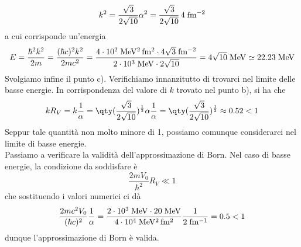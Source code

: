 \begin{soluzione}
\begin{equation*}
      k^2
      =\frac{\sqrt{3}}{2\sqrt{10}} \alpha^2
      =\rm \frac{\sqrt{3}}{2\sqrt{10}} \, 4 \; fm^{-2}
   \end{equation*}
   a cui corrisponde un'energia
   \begin{equation*}
      E
      =\frac{\hbar^2 k^2}{2 m}
      =\frac{(\hbar c)^2 k^2}{2 m c^2}
      =\rm \frac{4 \cdot 10^2 \; MeV^2 \, fm^2 \cdot 4\sqrt{3} \; fm^{-2}}{2 \cdot 10^3 \; MeV \cdot 2\sqrt{10}}
      =\rm 4\sqrt{10} \; MeV
      \simeq \rm 22.23 \; MeV
   \end{equation*}
   Svolgiamo infine il punto c). Verifichiamo innanzitutto di trovarci nel limite delle basse energie. In corrispondenza del valore di $k$ trovato nel punto b), si ha che
   \begin{equation*}
      k R_V
      =k \frac{1}{\alpha}
      =\qty( \frac{\sqrt{3}}{2\sqrt{10}} )^{\frac{1}{2}} \alpha \frac{1}{\alpha}
      =\qty( \frac{\sqrt{3}}{2\sqrt{10}} )^{\frac{1}{2}}
      \approx 0.52 < 1
   \end{equation*}
   Seppur tale quantità non molto minore di 1, possiamo comunque considerarci nel limite di basse energie.\\
   Passiamo a verificare la validità dell'approssimazione di Born. Nel caso di basse energie, la condizione da soddisfare è
   \begin{equation*}
      \frac{2 m V_0}{\hbar^2} R_V
      \ll 1
   \end{equation*}
   che sostituendo i valori numerici ci dà
   \begin{equation*}
      \frac{2 mc^2 V_0}{(\hbar c)^2} \frac{1}{\alpha}
      =\rm \frac{2 \cdot 10^3 \; MeV \cdot 20 \; MeV}{4 \cdot 10^4 \; MeV^2 \, fm^2} \frac{1}{2 \; fm^{-1}}
      =0.5 < 1
   \end{equation*}
   dunque l'approssimazione di Born è valida.
\end{soluzione}

\newpage
\setcounter{equation}{0}

